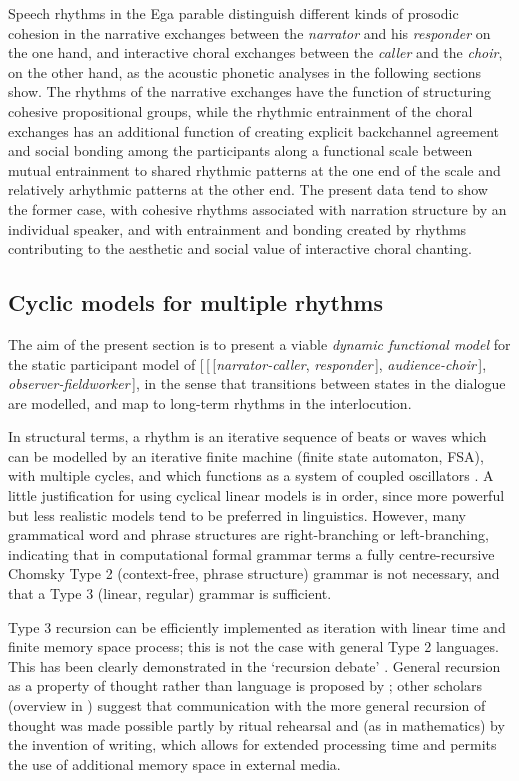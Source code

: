 \documentclass[output=paper,colorlinks,citecolor=brown]{langscibook}
\begin{document}
Speech rhythms in the Ega parable distinguish different kinds of prosodic cohesion in the narrative exchanges between the \textit{narrator} and his \textit{responder} on the one hand, and interactive choral exchanges between the \textit{caller} and the \textit{choir}, on the other hand, as the acoustic phonetic analyses in the following sections show. The rhythms of the narrative exchanges have the function of structuring cohesive propositional groups, while the rhythmic entrainment of the choral exchanges has an additional function of creating explicit backchannel agreement and social bonding among the participants along a functional scale between mutual entrainment to shared rhythmic patterns at the one end of the scale and relatively arhythmic patterns at the other end. The present data tend to show the former case, with cohesive rhythms associated with narration structure by an individual speaker, and with entrainment and bonding created by rhythms contributing to the aesthetic and social value of interactive choral chanting.

\subsection{Cyclic models for multiple rhythms}

The aim of the present section is to present a viable \textit{dynamic functional model} for the static participant model of [\,[\,[\textit{narrator-caller}, \textit{responder}\,], \textit{audience-choir}\,], \textit{observer-fieldworker}\,], in the sense that transitions between states in the dialogue are modelled, and map to long-term rhythms in the interlocution.

In structural terms, a rhythm is an iterative sequence of beats or waves which can be modelled by an iterative finite machine (finite state automaton, FSA), with multiple cycles, and which functions as a system of coupled oscillators \citep{cumminsport1998, odellnieminen1999, barbosa2002}. A little justification for using cyclical linear models is in order, since more powerful but less realistic models tend to be preferred in linguistics. However, many grammatical word and phrase structures are right-branching or left-branching, indicating that in computational formal grammar terms a fully centre-recursive Chomsky Type 2 (context-free, phrase structure) grammar is not necessary, and that a Type 3 (linear, regular) grammar is sufficient.

Type 3 recursion can be efficiently implemented as iteration with linear time and finite memory space process; this is not the case with general Type 2 languages. This has been clearly demonstrated in the `recursion debate' \citep{karlsson2010}. General recursion as a property of thought rather than language is proposed by \citet{everett2016}; other scholars (overview in ) suggest that communication with the more general recursion of thought was made possible partly by ritual rehearsal and (as in mathematics) by the invention of writing, which allows for extended processing time and permits the use of additional memory space in external media.
\end{document}
